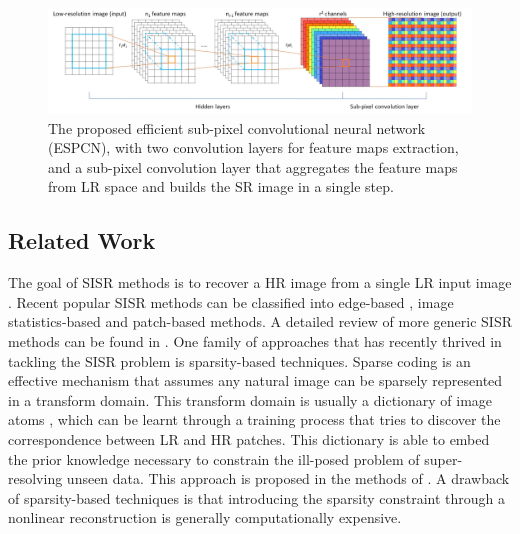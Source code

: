 \begin{figure}[htbp]
\begin{center}
\includegraphics[width=1.0\linewidth]{Chapter6/Figs/networkstructure.jpg}
\caption{The proposed efficient sub-pixel convolutional neural network (ESPCN), with two convolution layers for feature maps extraction, and a sub-pixel convolution layer that aggregates the feature maps from \ac{LR} space and builds the \ac{SR} image in a single step.}
\label{fig:networkstructure}
\end{center}
\end{figure}

\subsection{Related Work}

The goal of \ac{SISR} methods is to recover a \ac{HR} image from a single \ac{LR} input image \cite{glasner2009super}. Recent popular \ac{SISR} methods can be classified into edge-based \cite{sun2011gradient}, image statistics-based \cite{efrat2013accurate,he2011single,yang2013fast,fernandez2013super} and patch-based \cite{chang2004super,wang2012semi,zhang2012multi,gao2012image,zhu2014single,timofte2014a+,dai2015jointly} methods. A detailed review of more generic \ac{SISR} methods can be found in \cite{yang2014single}. One family of approaches that has recently thrived in tackling the \ac{SISR} problem is sparsity-based techniques. Sparse coding is an effective mechanism that assumes any natural image can be sparsely represented in a transform domain. This transform domain is usually a dictionary of image atoms \cite{Mallat:2008:WTS:1525499,Elad:2010:SRR:1895005}, which can be learnt through a training process that tries to discover the correspondence between \ac{LR} and \ac{HR} patches. This dictionary is able to embed the prior knowledge necessary to constrain the ill-posed problem of super-resolving unseen data. This approach is proposed in the methods of \cite{Yang2010c, Dong2011}. A drawback of sparsity-based techniques is that introducing the sparsity constraint through a nonlinear reconstruction is generally computationally expensive.

